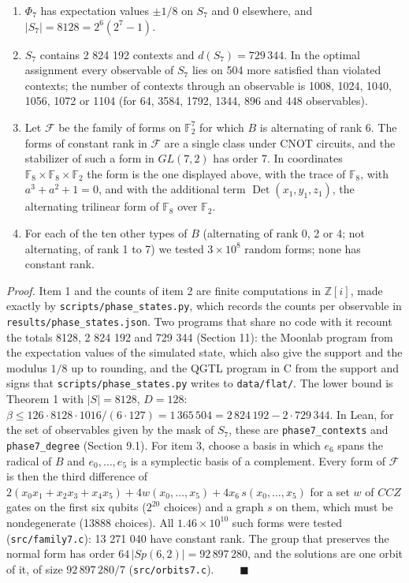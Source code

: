 \documentclass[11pt,a4paper]{article}
\providecommand{\tightlist}{\setlength{\itemsep}{0pt}\setlength{\parskip}{0pt}}
\begin{document}
\begin{enumerate}
\def\labelenumi{\arabic{enumi}.}
\tightlist
\item
  \(\Phi_7\) has expectation values \(\pm 1/8\) on \(S_7\) and \(0\) elsewhere, and \(|S_7| = 8128 = 2^6(2^7-1)\).
\item
  \(S_7\) contains 2 824 192 contexts and \(d(S_7) = 729\,344\). In the optimal assignment every observable
  of \(S_7\) lies on 504 more satisfied than violated contexts; the number of contexts through an
  observable is 1008, 1024, 1040, 1056, 1072 or 1104 (for 64, 3584, 1792, 1344, 896 and 448 observables).
\item
  Let \(\mathcal{F}\) be the family of forms on \(\mathbb{F}_2^7\) for which \(B\) is alternating of rank 6.
  The forms of constant rank in \(\mathcal{F}\) are a single class under CNOT circuits, and the stabilizer
  of such a form in \(GL(7,2)\) has order 7. In coordinates
  \(\mathbb{F}_8 \times \mathbb{F}_8 \times \mathbb{F}_2\) the form is the one displayed above, with the
  trace of \(\mathbb{F}_8\), with \(a^3 + a^2 + 1 = 0\), and with the additional term \(\operatorname{Det}(x_1,y_1,z_1)\),
  the alternating trilinear form of \(\mathbb{F}_8\) over \(\mathbb{F}_2\).
\item
  For each of the ten other types of \(B\) (alternating of rank 0, 2 or 4; not alternating, of rank 1
  to 7) we tested \(3 \times 10^8\) random forms; none has constant rank.
\end{enumerate}

\emph{Proof.} Item 1 and the counts of item 2 are finite computations in \(\mathbb{Z}[i]\), made exactly by
\nolinkurl{scripts/phase_states.py}, which records the counts per observable in \nolinkurl{results/phase_states.json}.
Two programs that share no code with it recount the totals 8128, 2 824 192 and 729 344 (Section 11):
the Moonlab program from the expectation values of the simulated state, which also give the support
and the modulus \(1/8\) up to rounding, and the QGTL program in C from the support and signs that
\nolinkurl{scripts/phase_states.py} writes to \texttt{data/flat/}. The lower bound is Theorem 1 with \(|S| = 8128\), \(D = 128\):
\(\beta \le 126 \cdot 8128 \cdot 1016/(6\cdot 127) = 1\,365\,504 = 2\,824\,192 - 2 \cdot 729\,344\). In Lean, for
the set of observables given by the mask of \(S_7\), these are \texttt{phase7\_contexts} and \texttt{phase7\_degree}
(Section 9.1). For item 3,
choose a basis in which \(e_6\) spans the radical of \(B\) and \(e_0,\dots,e_5\) is a symplectic basis of a
complement. Every form of \(\mathcal{F}\) is then the third difference of
\(2(x_0x_1 + x_2x_3 + x_4x_5) + 4w(x_0,\dots,x_5) + 4x_6\,s(x_0,\dots,x_5)\) for a set \(w\) of \(CCZ\) gates
on the first six qubits (\(2^{20}\) choices) and a graph \(s\) on them, which must be nondegenerate (13888
choices). All \(1.46 \times 10^{10}\) such forms were tested (\texttt{src/family7.c}): 13 271 040 have constant
rank. The group that preserves the normal form has order \(64\,|Sp(6,2)| = 92\,897\,280\), and the
solutions are one orbit of it, of size \(92\,897\,280/7\) (\texttt{src/orbits7.c}). \(\qquad\blacksquare\)
\end{document}
